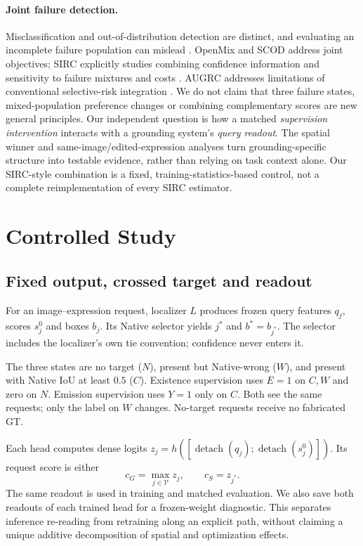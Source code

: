 \documentclass[10pt,twocolumn,letterpaper]{article}
\begin{document}
\paragraph{Joint failure detection.}
Misclassification and out-of-distribution detection are distinct, and
evaluating an incomplete failure population can mislead
\cite{jaeger2023failure}. OpenMix \cite{zhu2023openmix} and SCOD
\cite{narasimhan2024scod} address joint objectives; SIRC explicitly
studies combining confidence information and sensitivity to failure
mixtures and costs \cite{xia2024sirc}. AUGRC addresses limitations of
conventional selective-risk integration \cite{traub2024augrc}.
We do not claim that three failure states, mixed-population preference
changes or combining complementary scores are new general principles.
Our independent question is how a matched \emph{supervision intervention}
interacts with a grounding system's \emph{query readout}. The spatial
winner and same-image/edited-expression analyses turn grounding-specific
structure into testable evidence, rather than relying on task context
alone. Our SIRC-style combination is a fixed, training-statistics-based
control, not a complete reimplementation of every SIRC estimator.

\section{Controlled Study}
\subsection{Fixed output, crossed target and readout}
For an image--expression request, localizer $L$ produces frozen query
features $q_j$, scores $s_j^0$ and boxes $b_j$. Its Native selector yields
$j^*$ and $b^*=b_{j^*}$. The selector includes the localizer's own
tie convention; confidence never enters it.

The three states are no target ($N$), present but Native-wrong ($W$),
and present with Native IoU at least $0.5$ ($C$).
Existence supervision uses $E=1$ on $C,W$ and zero on $N$.
Emission supervision uses $Y=1$ only on $C$. Both see the same requests;
only the label on $W$ changes. No-target requests receive no fabricated GT.

Each head computes dense logits
$z_j=h([\operatorname{detach}(q_j);
\operatorname{detach}(s_j^0)])$. Its request score is either
\begin{equation}
 c_G=\max_{j\in\mathcal V}z_j,\qquad c_S=z_{j^*}.
\end{equation}
The same readout is used in training and matched evaluation. We also save
both readouts of each trained head for a frozen-weight diagnostic.
This separates inference re-reading from retraining along an explicit
path, without claiming a unique additive decomposition of spatial and
optimization effects.
\end{document}
